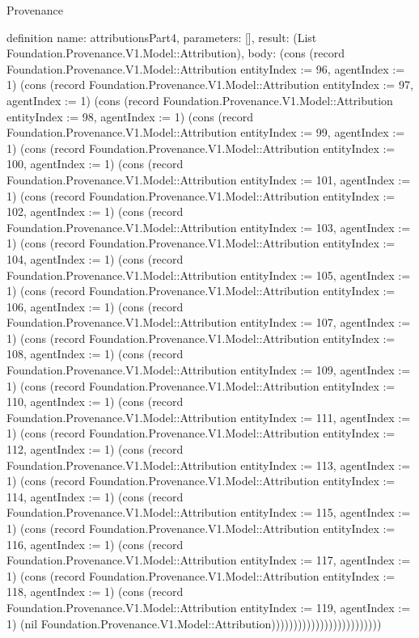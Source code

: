 \begin{lexlean}{Provenance}
\begin{semanticmodule}
definition{
  name: attributionsPart4,
  parameters: [],
  result: (List Foundation.Provenance.V1.Model::Attribution),
  body: (cons (record Foundation.Provenance.V1.Model::Attribution {entityIndex := 96, agentIndex := 1}) (cons (record Foundation.Provenance.V1.Model::Attribution {entityIndex := 97, agentIndex := 1}) (cons (record Foundation.Provenance.V1.Model::Attribution {entityIndex := 98, agentIndex := 1}) (cons (record Foundation.Provenance.V1.Model::Attribution {entityIndex := 99, agentIndex := 1}) (cons (record Foundation.Provenance.V1.Model::Attribution {entityIndex := 100, agentIndex := 1}) (cons (record Foundation.Provenance.V1.Model::Attribution {entityIndex := 101, agentIndex := 1}) (cons (record Foundation.Provenance.V1.Model::Attribution {entityIndex := 102, agentIndex := 1}) (cons (record Foundation.Provenance.V1.Model::Attribution {entityIndex := 103, agentIndex := 1}) (cons (record Foundation.Provenance.V1.Model::Attribution {entityIndex := 104, agentIndex := 1}) (cons (record Foundation.Provenance.V1.Model::Attribution {entityIndex := 105, agentIndex := 1}) (cons (record Foundation.Provenance.V1.Model::Attribution {entityIndex := 106, agentIndex := 1}) (cons (record Foundation.Provenance.V1.Model::Attribution {entityIndex := 107, agentIndex := 1}) (cons (record Foundation.Provenance.V1.Model::Attribution {entityIndex := 108, agentIndex := 1}) (cons (record Foundation.Provenance.V1.Model::Attribution {entityIndex := 109, agentIndex := 1}) (cons (record Foundation.Provenance.V1.Model::Attribution {entityIndex := 110, agentIndex := 1}) (cons (record Foundation.Provenance.V1.Model::Attribution {entityIndex := 111, agentIndex := 1}) (cons (record Foundation.Provenance.V1.Model::Attribution {entityIndex := 112, agentIndex := 1}) (cons (record Foundation.Provenance.V1.Model::Attribution {entityIndex := 113, agentIndex := 1}) (cons (record Foundation.Provenance.V1.Model::Attribution {entityIndex := 114, agentIndex := 1}) (cons (record Foundation.Provenance.V1.Model::Attribution {entityIndex := 115, agentIndex := 1}) (cons (record Foundation.Provenance.V1.Model::Attribution {entityIndex := 116, agentIndex := 1}) (cons (record Foundation.Provenance.V1.Model::Attribution {entityIndex := 117, agentIndex := 1}) (cons (record Foundation.Provenance.V1.Model::Attribution {entityIndex := 118, agentIndex := 1}) (cons (record Foundation.Provenance.V1.Model::Attribution {entityIndex := 119, agentIndex := 1}) (nil Foundation.Provenance.V1.Model::Attribution)))))))))))))))))))))))))
}


\end{semanticmodule}
\end{lexlean}
